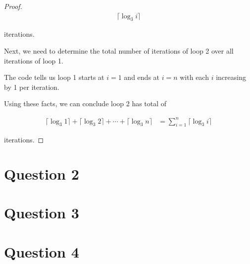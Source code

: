 \documentclass[12pt]{article}
\begin{document}
\begin{enumerate}[a.]
\begin{proof}
        \begin{align}
            \lceil \log_3 i \rceil
        \end{align}

        iterations.

        \bigskip

        Next, we need to determine the total number of iterations of loop 2
        over all iterations of loop 1.

        \bigskip

        The code tells us loop 1 starts at $i = 1$ and ends at $i = n$ with each
        $i$ increasing by 1 per iteration.

        \bigskip

        Using these facts, we can conclude loop 2 has total of

        \begin{align}
            \lceil \log_3 1 \rceil + \lceil \log_3 2 \rceil + \cdots + \lceil \log_3 n \rceil &= \sum\limits_{i=1}^n \lceil \log_3 i \rceil
        \end{align}

        iterations.
    \end{proof}

\end{enumerate}

\section*{Question 2}

\section*{Question 3}

\section*{Question 4}
\end{document}

